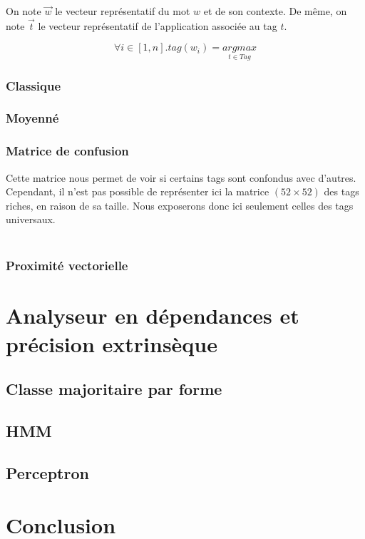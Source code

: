 \documentclass{article}
\begin{document}
On note $\overrightarrow{w}$ le vecteur représentatif du mot $w$ et de son contexte. De même, on note $\overrightarrow{t}$ le vecteur représentatif de l'application associée au tag $t$.


$$\forall i \in [1,n] . tag(w_i) = \underset{t \in Tag}{argmax}$$

\subsubsection{Classique}

\subsubsection{Moyenné}

\subsubsection{Matrice de confusion}

Cette matrice nous permet de voir si certains tags sont confondus avec d'autres. Cependant, il n'est pas possible de représenter ici la matrice $(52 \times 52)$ des tags riches, en raison de sa taille. Nous exposerons donc ici seulement celles des tags universaux.

$$
\begin{array}{l|c|c|c|c|c|c|c|c|c|c|c|c}

\end{array}
$$

\subsubsection{Proximité vectorielle}

\section{Analyseur en dépendances et précision extrinsèque}

\subsection{Classe majoritaire par forme}

\subsection{HMM}

\subsection{Perceptron}

\section{Conclusion}
\end{document}
